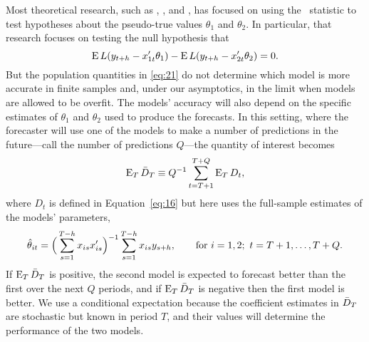\documentclass[11pt]{article}
\begin{document}
Most theoretical research, such as \citet{DiM:95}, \citet{Wes:96},
and \cite{Mcc:07}, has focused on using the \oost\ statistic to test
hypotheses about the pseudo-true values $\theta_1$ and $\theta_2$.  In
particular, that research focuses on testing the null hypothesis that
\begin{equation}\label{eq:21}
  \operatorname{E} L(y_{t+h} - x_{1t}'\theta_{1}) - \operatorname{E} L(y_{t+h} - x_{2t}'\theta_{2}) = 0.
\end{equation}
But the population quantities in \eqref{eq:21} do not determine which
model is more accurate in finite samples and, under our asymptotics,
in the limit when models are allowed to be overfit. The models'
accuracy will also depend on the specific estimates of $\theta_1$ and
$\theta_2$ used to produce the forecasts. In this setting, where the
forecaster will use one of the models to make a number of predictions
in the future---call the number of predictions $Q$---the quantity of
interest becomes
\begin{equation}
  \operatorname{E}_T \bar{D}_{T} \equiv Q^{-1} \sum_{t=T+1}^{T+Q} \operatorname{E}_T D_t,
\end{equation}
where $D_t$ is defined in Equation~\eqref{eq:16} but here uses the
full-sample estimates of the models' parameters,
\begin{equation}
  \hat\theta_{it} = \Big(\sum_{s=1}^{T-h} x_{is}x_{is}'\Big)^{-1} \sum_{s=1}^{T-h}
  x_{is} y_{s+h}, \qquad \text{for } i=1,2;\ t = T+1,\dots, T + Q.
\end{equation}
If $\operatorname{E}_T \bar{D}_{T}$ is positive, the second model is expected to forecast
better than the first over the next $Q$ periods, and if $\operatorname{E}_T \bar{D}_{T}$
is negative then the first model is better. We use a conditional
expectation because the coefficient estimates in $\bar{D}_{T}$ are
stochastic but known in period $T$, and their values will determine
the performance of the two models.
\end{document}
